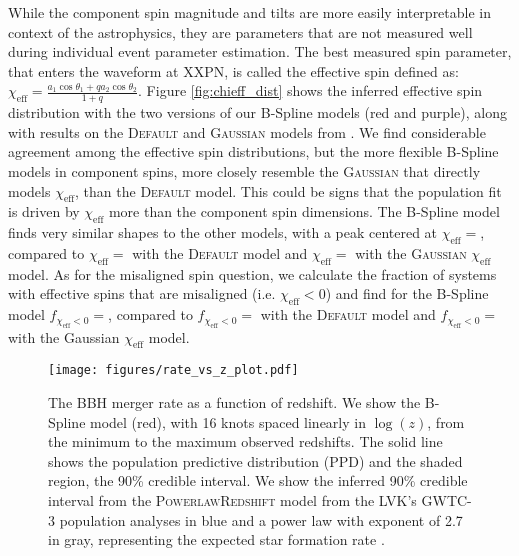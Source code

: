 While the component spin magnitude and tilts are more easily interpretable in context of the astrophysics, they are parameters that 
are not measured well during individual event parameter estimation. The best measured spin parameter, that enters the waveform at XXPN, is 
called the effective spin defined as: $\chi_\mathrm{eff} = \frac{a_1\cos{\theta_1} + qa_2\cos{\theta_2}}{1+q}$. Figure \ref{fig:chieff_dist} 
shows the inferred effective spin distribution with the two versions of our B-Spline models (red and purple), 
along with results on the \textsc{Default} and \textsc{Gaussian} models from \citet{o3b_astro_dist}. We find considerable agreement 
among the effective spin distributions, but the more flexible B-Spline models in component spins, more closely resemble the \textsc{Gaussian} 
that directly models $\chi_\mathrm{eff}$, than the \textsc{Default} model. This could be signs that the population fit is driven by $\chi_\mathrm{eff}$ 
more than the component spin dimensions. The B-Spline model finds very similar shapes to the other models, with a peak centered at 
$\chi_\mathrm{eff}=$\result{$\CIPlusMinus{\macros[ChiEffective][iid][PeakChiEff]}$}, compared to 
$\chi_\mathrm{eff}=$\result{$\CIPlusMinus{\macros[ChiEffective][default][PeakChiEff]}$} with the \textsc{Default} model and 
$\chi_\mathrm{eff}=$\result{$\CIPlusMinus{\macros[ChiEffective][gaussian][PeakChiEff]}$} with the \textsc{Gaussian} $\chi_\mathrm{eff}$ model. 
As for the misaligned spin question, we calculate the fraction of systems with effective spins that are misaligned (i.e. $\chi_\mathrm{eff}<0$) and 
find for the B-Spline model $f_{\chi_\mathrm{eff}<0}=$\result{$\CIPlusMinus{\macros[ChiEffective][iid][FracBelow0]}$}, compared to 
$f_{\chi_\mathrm{eff}<0}=$\result{$\CIPlusMinus{\macros[ChiEffective][default][FracBelow0]}$} with the \textsc{Default} model and 
$f_{\chi_\mathrm{eff}<0}=$\result{$\CIPlusMinus{\macros[ChiEffective][gaussian][FracBelow0]}$} with the Gaussian $\chi_\mathrm{eff}$ model.

\begin{figure}[h]
    \texttt{[image: figures/rate\_vs\_z\_plot.pdf]}
    \caption{The BBH merger rate as a function of redshift. We show the B-Spline model (red), with 16 knots spaced linearly in $\log(z)$, 
    from the minimum to the maximum observed redshifts. The solid line shows the population predictive distribution (PPD) and the shaded region, 
    the 90\% credible interval. We show the inferred 90\% credible interval from the \textsc{PowerlawRedshift} model 
    from the LVK's GWTC-3 population analyses in blue and a power law with exponent of 2.7 in gray, representing the expected star formation rate 
    \citep{Madau_2014, o3b_astro_dist}.}
    \label{fig:rofz}
\end{figure}

